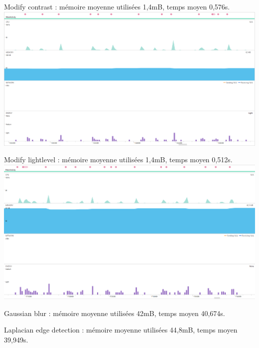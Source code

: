 \documentclass[12pt]{article}
\begin{document}
\begin{itemize}
 \bigskip




    Modify contrast : mémoire moyenne utilisées 1,4mB, temps moyen 0,576s.\\



    \includegraphics[width=\textwidth]{modifycontrast}

 \bigskip





    Modify lightlevel : mémoire moyenne utilisées 1,4mB, temps moyen 0,512s.\\



    \includegraphics[width=\textwidth]{modifylight}

 \bigskip






    Gaussian blur  : mémoire moyenne utilisées 42mB, temps moyen 40,674s.\\

 \bigskip




    Laplacian edge detection : mémoire moyenne utilisées 44,8mB, temps moyen 39,949s.\\


\end{itemize}
\end{document}
